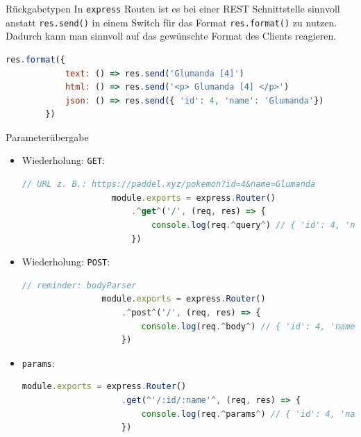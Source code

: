 \begin{bonus}{Rückgabetypen}
    In \texttt{express} Routen ist es bei einer REST Schnittstelle sinnvoll anstatt \texttt{res.send()} in einem Switch für das Format \texttt{res.format()} zu nutzen.
    Dadurch kann man sinnvoll auf das gewünschte Format des Clients reagieren.

    \begin{lstlisting}[language=JavaScript]
        res.format({
            text: () => res.send('Glumanda [4]')
            html: () => res.send('<p> Glumanda [4] </p>')
            json: () => res.send({ 'id': 4, 'name': 'Glumanda'})
        })
    \end{lstlisting}
\end{bonus}

\begin{bonus}{Parameterübergabe}
    \begin{itemize}
        \item Wiederholung: \texttt{GET}:

              \begin{lstlisting}[language=JavaScript]
                  // URL z. B.: https://paddel.xyz/pokemon?id=4&name=Glumanda
                  module.exports = express.Router()
                      .^get^('/', (req, res) => {
                          console.log(req.^query^) // { 'id': 4, 'name': 'Glumanda' }
                      })
              \end{lstlisting}
        \item Wiederholung: \texttt{POST}:

              \begin{lstlisting}[language=JavaScript]
                // reminder: bodyParser
                module.exports = express.Router()
                    .^post^('/', (req, res) => {
                        console.log(req.^body^) // { 'id': 4, 'name': 'Glumanda' }
                    })
            \end{lstlisting}
        \item \texttt{params}:

              \begin{lstlisting}[language=JavaScript]
                module.exports = express.Router()
                    .get(^'/:id/:name'^, (req, res) => {
                        console.log(req.^params^) // { 'id': 4, 'name': 'Glumanda' }
                    })
            \end{lstlisting}
    \end{itemize}
\end{bonus}

